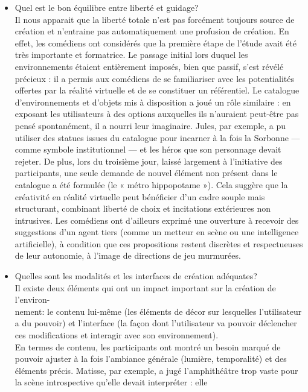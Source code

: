 \begin{itemize}
    \item Quel est le bon équilibre entre liberté et guidage?
    \\Il nous apparait que la liberté totale n'est pas forcément toujours source de création et n'entraine pas 
    automatiquement une profusion de création. En effet, les comédiens ont considérés que la première étape de l'étude 
    avait été très importante et formatrice. Le passage initial lors duquel les environnements étaient entièrement imposés, bien que passif, 
    s’est révélé précieux : il a permis aux comédiens de se familiariser avec les potentialités offertes par la réalité virtuelle et de se 
    constituer un référentiel. Le catalogue d’environnements et d’objets mis à disposition a joué un rôle similaire : en exposant les 
    utilisateurs à des options auxquelles ils n’auraient peut-être pas pensé spontanément, il a nourri leur imaginaire. Jules, par exemple, 
    a pu utiliser des statues issues du catalogue pour incarner à la fois la Sorbonne — comme symbole institutionnel — et les héros que son 
    personnage devait rejeter. De plus, lors du troisième jour, laissé largement à l’initiative des participants, une seule demande de nouvel 
    élément non présent dans le catalogue a été formulée (le « métro hippopotame »). Cela suggère que la créativité en réalité virtuelle 
    peut bénéficier d’un cadre souple mais structurant, combinant liberté de choix et incitations extérieures non intrusives. Les comédiens 
    ont d’ailleurs exprimé une ouverture à recevoir des suggestions d’un agent tiers (comme un metteur en scène ou une intelligence artificielle), 
    à condition que ces propositions restent discrètes et respectueuses de leur autonomie, à l’image de directions de jeu murmurées.
    \item Quelles sont les modalités et les interfaces de création adéquates? 
    \\Il existe deux éléments qui ont un impact important sur la création de 
    l'environ- \\ nement: le contenu lui-même (les éléments de décor sur 
    lesquelles l'utilisateur a du pouvoir) et l'interface (la façon dont l'utilisateur va pouvoir déclencher ces modifications et interagir avec 
    son environnement). 
    \\En termes de contenu, les participants ont montré un besoin marqué de pouvoir ajuster à la fois l’ambiance générale (lumière, temporalité) 
    et des éléments précis. Matisse, par exemple, a jugé l’amphithéâtre trop vaste pour la scène introspective qu’elle devait interpréter : elle 

\end{itemize}
